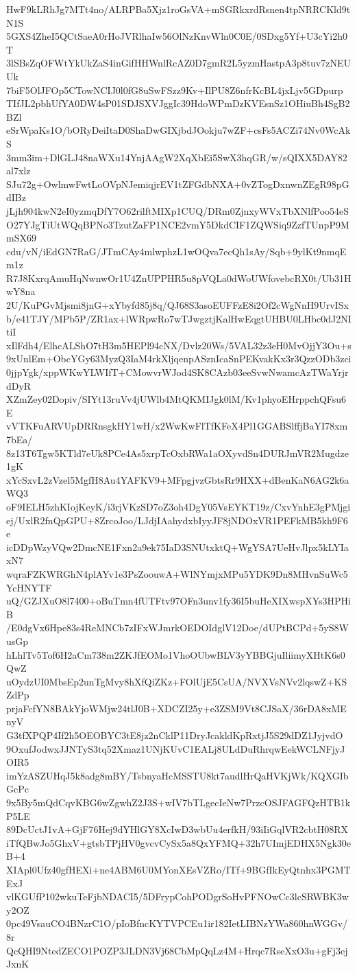 HwF9kLRhJg7MTt4no/ALRPBa5Xjz1roGsVA+mSGRkxrdRsnen4tpNRRCKld9tN1S
5GXS4ZheI5QCtSaeA0rHoJVRlhaIw56OlNzKnvWln0C0E/0SDxg5Yf+U3cYi2h0T
3lSBsZqOFWtYkUkZaS4inGifHHWnlRcAZ0D7gmR2L5yzmHastpA3p8tuv7zNEUUk
7biF5OlJFOp5CTowNCIJ0l0fG8uSwFSzz9Kv+IlPU8Z6nfrKcBL4jxLjv5GDpurp
TIfJL2pbhUfYA0DW4sP01SDJSXVJggIc39HdoWPmDzKVEsnSz1OHiuBh4SgB2BZl
eSrWpaKs1O/bORyDeiItaD0ShaDwGIXjbdJOokju7wZF+csFs5ACZi74Nv0WcAkS
3mm3im+DlGLJ48naWXu14YnjAAgW2XqXbEi5SwX3hqGR/w/sQIXX5DAY82al7xlz
SJu72g+OwlmwFwtLoOVpNJemiqjrEV1tZFGdbNXA+0vZTogDxnwnZEgR98pGdIBz
jLjh904kwN2eI0yzmqDfY7O62rilftMIXp1CUQ/DRm0ZjnxyWVxTbXNlfPoo54eS
O27YJgTiUtWQqBPNo3TzutZaFP1NCE2vmY5DkdCIF1ZQWSiq9ZzfTUnpP9MmSX69
cdu/vN/iEdGN7RaG/JTmCAy4mlwphzL1wOQva7ecQh1sAy/Sqb+9ylKt9nmqEm1z
R7J8KxrqAmuHqNwnwOr1U4ZnUPPHR5u8pVQLa0dWoUWfovebcRX0t/Ub31HwY8na
2U/KuPGvMjsmi8jnG+xYbyfd85j8q/QJ68S3asoEUFFzE8i2Of2cWgNnH9UrvISx
b/e41TJY/MPb5P/ZR1ax+lWRpwRo7wTJwgztjKalHwEqgtUHBU0LHbc0dJ2NItiI
xIlFdh4/ElhcALShO7tH3m5HEPl94cNX/Dvlz20Ws/5VAL32z3eH0MvOjjY3Ou+s
9xUnlEm+ObcYGy63MyzQ3IaM4rkXljqenpASznIcaSnPEKvakKx3r3QzzODb3zci
0jjpYgk/xppWKwYLWIfT+CMowvrWJod4SK8CAzb03eeSvwNwamcAzTWaYrjrdDyR
XZmZey02Dopiv/SIYt13ruVv4jUWlb4MtQKMIJgk0lM/Kv1phyoEHrppchQFsu6E
vVTKFuARVUpDRRnsgkHY1wH/x2WwKwFlTfKFeX4Pl1GGABSlffjBaYI78xm7bEa/
8z13T6Tgw5KTld7eUk8PCe4As5xrpTcOxbRWa1aOXyvdSn4DURJmVR2Mugdze1gK
xYcSxvL2zVzel5MgfH8Au4YAFKV9+MFpgjvzGbtsRr9HXX+dBenKaN6AG2k6aWQ3
oF9IELH5zhKIojKeyK/i3rjVKzSD7oZ3oh4DgY05VsEYKT19z/CxvYnhE3gPMjgi
ej/UxlR2fnQpGPU+8ZrcoJoo/LJdjIAahydxbIyyJF8jNDOxVR1PEFkMB5kh9F6e
icDDpWzyVQw2DmcNE1Fxn2a9ek75IaD3SNUtxktQ+WgYSA7UeHvJlpx5kLYIaxN7
wqraFZKWRGhN4plAYv1e3PsZoouwA+WlNYmjxMPu5YDK9Dn8MHvnSuWc5YcHNYTF
uQ/GZJXuO8l7400+oBuTmn4fUTFtv97OFn3unv1fy36I5buHeXIXwspXYs3HPHiB
/E0dgVx6Hpe83s4ReMNCb7zIFxWJmrkOEDOIdglV12Doe/dUPtBCPd+5yS8WusGp
hLhlTv5Tof6H2aCm738m2ZKJfEOMo1VhoOUbwBLV3yYBBGjuIliimyXHtK6s0QwZ
uOydzUI0MbsEp2unTgMvy8hXfQiZKz+FOlUjE5CsUA/NVXVsNVv2lqswZ+KSZdPp
prjaFcfYN8BAkYjoWMjw24tlJ0B+XDCZI25y+e3ZSM9Vt8CJSaX/36rDA8xMEnyV
G3tfXPQP4If2h5OEOBYC3tE8jz2nCklP11DryJcakldKpRxtjJ5S29dDZ1JyjvdO
9OxufJodwxJJNTyS3tq52Xmaz1UNjKUvC1EALj8ULdDuRhrqwEekWCLNFjyJOIR5
imYzASZUHqJ5k8adg8mBY/TsbnyaHcMSSTU8kt7audlHrQaHVKjWk/KQXGIbGcPc
9x5By5mQdCqvKBG6wZgwhZ2J3S+wIV7bTLgecIeNw7PrzcOSJFAGFQzHTB1kP5LE
89DcUctJ1vA+GjF76Hej9dYHlGY8XcIwD3wbUu4erfkH/93iIiGqlVR2cbtH08RX
iTfQBwJo5GhxV+gtsbTPjHV0gvcvCySx5a8QxYFMQ+32h7UImjEDHX5Ngk30eB+4
XIApl0Ufz40gfHEXi+ne4ABM6U0MYonXEsVZRo/ITf+9BGfIkEyQtnhx3PGMTExJ
vlKGUfP102wkuTeFjbNDACI5/5DFrypCohPODgrSoHvPFNOwCc3lcSRWBK3wy2OZ
0pc49VsauCO4BNzrC1O/pIoBfncKYTVPCEu1ir182IetLIBNzYWa860hnWGGv/8r
QcQHI9NtedZECO1POZP3JLDN3Vj68CbMpQqLz4M+Hrqc7RseXxO3u+gFj3ejJxnK
